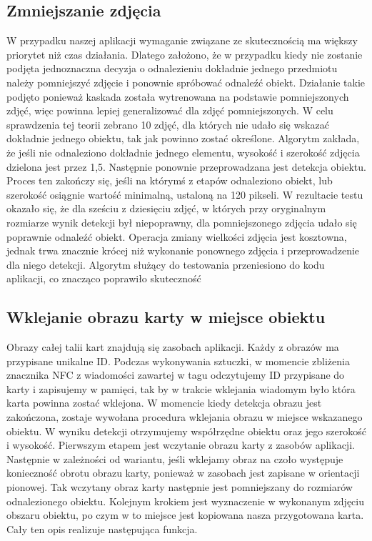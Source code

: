 \subsection{Zmniejszanie zdjęcia}
W przypadku naszej aplikacji wymaganie związane ze skutecznością ma większy priorytet niż czas działania. Dlatego założono, że w przypadku kiedy nie zostanie podjęta jednoznaczna decyzja o odnalezieniu dokładnie jednego przedmiotu należy pomniejszyć zdjęcie i ponownie spróbować odnaleźć obiekt. Działanie takie podjęto ponieważ kaskada została wytrenowana na podstawie pomniejszonych zdjęć, więc powinna lepiej generalizować dla zdjęć pomniejszonych. W celu sprawdzenia tej teorii zebrano 10 zdjęć, dla których nie udało się wskazać dokładnie jednego obiektu, tak jak powinno zostać określone. Algorytm zakłada, że jeśli nie odnaleziono dokładnie jednego elementu, wysokość i szerokość zdjęcia dzielona jest przez 1,5. Następnie ponownie przeprowadzana jest detekcja obiektu. Proces ten zakończy się, jeśli na którymś z etapów odnaleziono obiekt, lub szerokość osiągnie wartość minimalną, ustaloną na 120 pikseli. W rezultacie testu okazało się, że dla sześciu z dziesięciu zdjęć, w których przy oryginalnym rozmiarze wynik detekcji był niepoprawny, dla pomniejszonego zdjęcia udało się poprawnie odnaleźć obiekt. Operacja zmiany wielkości zdjęcia jest kosztowna, jednak trwa znacznie krócej niż wykonanie ponownego zdjęcia i przeprowadzenie dla niego detekcji. Algorytm służący do testowania przeniesiono do kodu aplikacji, co znacząco poprawiło skuteczność

\subsection{Wklejanie obrazu karty w miejsce obiektu}

Obrazy całej talii kart znajdują się zasobach aplikacji. Każdy z obrazów ma przypisane unikalne ID. Podczas wykonywania sztuczki, w momencie zbliżenia znacznika NFC z wiadomości zawartej w tagu odczytujemy ID przypisane do karty i zapisujemy w pamięci, tak by w trakcie wklejania wiadomym było która karta powinna zostać wklejona. 
W momencie kiedy detekcja obrazu jest zakończona, zostaje wywołana procedura wklejania obrazu w miejsce wskazanego obiektu. W wyniku detekcji otrzymujemy współrzędne obiektu oraz jego szerokość i wysokość. Pierwszym etapem jest wczytanie obrazu karty z zasobów aplikacji. Następnie w zależności od wariantu, jeśli wklejamy obraz na czoło występuje konieczność obrotu obrazu karty, ponieważ w zasobach jest zapisane w orientacji pionowej. Tak wczytany obraz karty następnie jest pomniejszany do rozmiarów odnalezionego obiektu. Kolejnym krokiem jest wyznaczenie w wykonanym zdjęciu obszaru obiektu, po czym w to miejsce jest kopiowana nasza przygotowana karta. Cały ten opis realizuje następująca funkcja.

